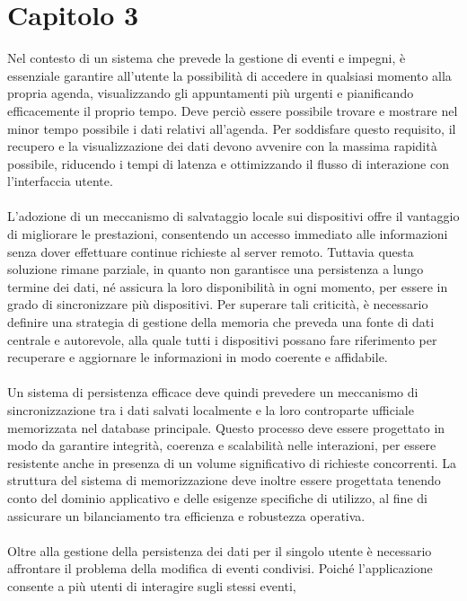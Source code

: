 \chapter{Capitolo 3}

Nel contesto di un sistema che prevede la gestione di eventi e impegni,
è essenziale garantire all'utente la possibilità 
di accedere in qualsiasi momento alla propria agenda,
visualizzando gli appuntamenti più urgenti e pianificando efficacemente il proprio tempo.
Deve perciò essere possibile trovare e mostrare
nel minor tempo possibile i dati relativi all'agenda.
Per soddisfare questo requisito,
il recupero e la visualizzazione dei dati devono avvenire con la massima rapidità possibile,
riducendo i tempi di latenza e ottimizzando il flusso di interazione con l'interfaccia utente.\\
\\
L'adozione di un meccanismo di salvataggio locale sui dispositivi
offre il vantaggio di migliorare le prestazioni,
consentendo un accesso immediato alle informazioni
senza dover effettuare continue richieste al server remoto.
Tuttavia questa soluzione rimane parziale,
in quanto non garantisce una persistenza a lungo termine dei dati,
né assicura la loro disponibilità in ogni momento,
per essere in grado di sincronizzare più dispositivi.
Per superare tali criticità,
è necessario definire una strategia di gestione della memoria
che preveda una fonte di dati centrale e autorevole,
alla quale tutti i dispositivi possano fare riferimento per recuperare e
aggiornare le informazioni in modo coerente e affidabile.\\
\\
Un sistema di persistenza efficace deve quindi prevedere
un meccanismo di sincronizzazione tra i dati salvati localmente e
la loro controparte ufficiale memorizzata nel database principale.
Questo processo deve essere progettato in modo da garantire
integrità, coerenza e scalabilità nelle interazioni,
per essere resistente anche in presenza di un volume significativo di richieste concorrenti.
La struttura del sistema di memorizzazione deve inoltre essere progettata
tenendo conto del dominio applicativo e delle esigenze specifiche di utilizzo,
al fine di assicurare un bilanciamento tra efficienza e robustezza operativa.\\
\\
Oltre alla gestione della persistenza dei dati per il singolo utente
è necessario affrontare il problema della modifica di eventi condivisi.
Poiché l'applicazione consente a più utenti di interagire sugli stessi eventi,
